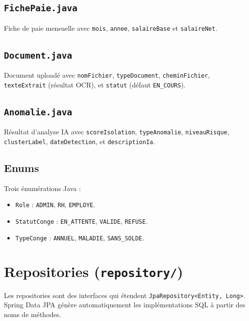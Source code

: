 \documentclass[a4paper,12pt]{report}
\begin{document}
\subsection{\texttt{FichePaie.java}}
Fiche de paie mensuelle avec \texttt{mois}, \texttt{annee}, \texttt{salaireBase} et \texttt{salaireNet}.

\subsection{\texttt{Document.java}}
Document uploadé avec \texttt{nomFichier}, \texttt{typeDocument}, \texttt{cheminFichier}, \texttt{texteExtrait} (résultat OCR), et \texttt{statut} (défaut \texttt{EN\_COURS}).

\subsection{\texttt{Anomalie.java}}
Résultat d'analyse IA avec \texttt{scoreIsolation}, \texttt{typeAnomalie}, \texttt{niveauRisque}, \texttt{clusterLabel}, \texttt{dateDetection}, et \texttt{descriptionIa}.

\subsection{Enums}
Trois énumérations Java :
\begin{itemize}
  \item \texttt{Role} : \texttt{ADMIN}, \texttt{RH}, \texttt{EMPLOYE}.
  \item \texttt{StatutConge} : \texttt{EN\_ATTENTE}, \texttt{VALIDE}, \texttt{REFUSE}.
  \item \texttt{TypeConge} : \texttt{ANNUEL}, \texttt{MALADIE}, \texttt{SANS\_SOLDE}.
\end{itemize}

\section{Repositories (\texttt{repository/})}

Les repositories sont des interfaces qui étendent \texttt{JpaRepository<Entity, Long>}. Spring Data JPA génère automatiquement les implémentations SQL à partir des noms de méthodes.
\end{document}
